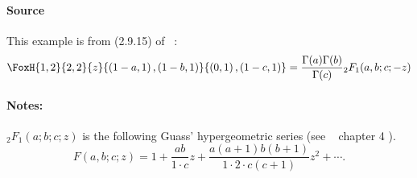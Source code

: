 \paragraph{Source} This example is from (2.9.15) of
~\cite{kilbas.saigo:04:h-transforms}:
\begin{align*}
  \FoxH
    {1,2}
    {2,2}
    {z}
    {\left(1-a, 1\right), \left(1-b, 1\right)}
    {\left(0, 1\right), \left(1-c, 1\right)}=\frac{\Gamma(a)\Gamma(b)}{\Gamma(c)}{}_2F_1(a,b;c;-z)
\end{align*}
\paragraph{Notes:}
${}_2F_1(a;b;c;z)$ is the following Guass' hypergeometric series (see ~\cite{erdelyi.magnus.ea:81:higher*1} chapter 4 ).
$$F(a, b ; c ; z)=1+\frac{a b}{1 \cdot c} z+\frac{a(a+1) b(b+1)}{1 \cdot 2 \cdot c(c+1)} z^2+\cdots .$$

